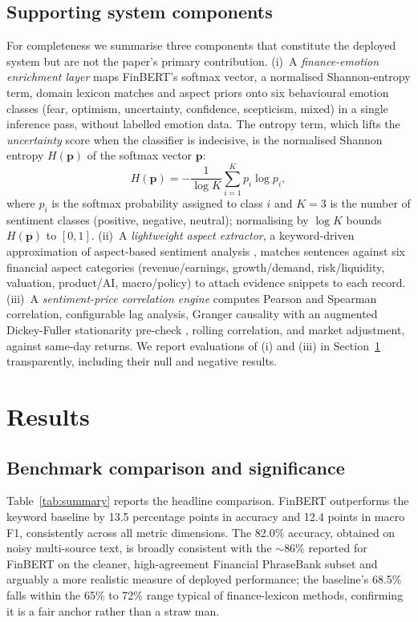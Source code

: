 \documentclass{aims}
\numberwithin{equation}{section}
\begin{document}
\subsection{Supporting system components}\label{sec:supporting}
For completeness we summarise three components that constitute the deployed system
but are not the paper's primary contribution. (i)~A \emph{finance-emotion enrichment
layer} maps FinBERT's softmax vector, a normalised Shannon-entropy term, domain
lexicon matches and aspect priors onto six behavioural emotion classes (fear,
optimism, uncertainty, confidence, scepticism, mixed) in a single inference pass,
without labelled emotion data. The entropy term, which lifts the
\emph{uncertainty} score when the classifier is indecisive, is the normalised
Shannon entropy $H(\mathbf{p})$ of the softmax vector $\mathbf{p}$:
\begin{equation*}
H(\mathbf{p}) = -\frac{1}{\log K}\sum_{i=1}^{K} p_i \log p_i,
\end{equation*}
where $p_i$ is the softmax probability assigned to class $i$ and $K = 3$ is the
number of sentiment classes (positive, negative, neutral); normalising by $\log K$
bounds $H(\mathbf{p})$ to $[0,1]$.
(ii)~A \emph{lightweight aspect extractor}, a keyword-driven approximation of
aspect-based sentiment analysis \citep{pontiki2014}, matches sentences against six
financial aspect categories (revenue/earnings, growth/demand, risk/liquidity,
valuation, product/AI, macro/policy) to attach evidence snippets to each record. (iii)~A
\emph{sentiment-price correlation engine} computes Pearson and Spearman
correlation, configurable lag analysis, Granger causality \citep{granger1969} with
an augmented Dickey-Fuller stationarity pre-check \citep{dickey1979}, rolling
correlation, and market adjustment, against same-day returns. We report evaluations
of (i) and (iii) in Section~\ref{sec:results} transparently, including their null
and negative results.

\section{Results}\label{sec:results}
\subsection{Benchmark comparison and significance}
Table~\ref{tab:summary} reports the headline comparison. FinBERT outperforms the
keyword baseline by 13.5 percentage points in accuracy and 12.4 points in macro F1,
consistently across all metric dimensions. The 82.0\% accuracy, obtained on noisy
multi-source text, is broadly consistent with the $\sim$86\% reported for FinBERT on
the cleaner, high-agreement Financial PhraseBank subset \citep{araci2019,malo2014}
and arguably a more realistic measure of deployed performance; the baseline's 68.5\%
falls within the 65\% to 72\% range typical of finance-lexicon methods, confirming it
is a fair anchor rather than a straw man.
\end{document}
